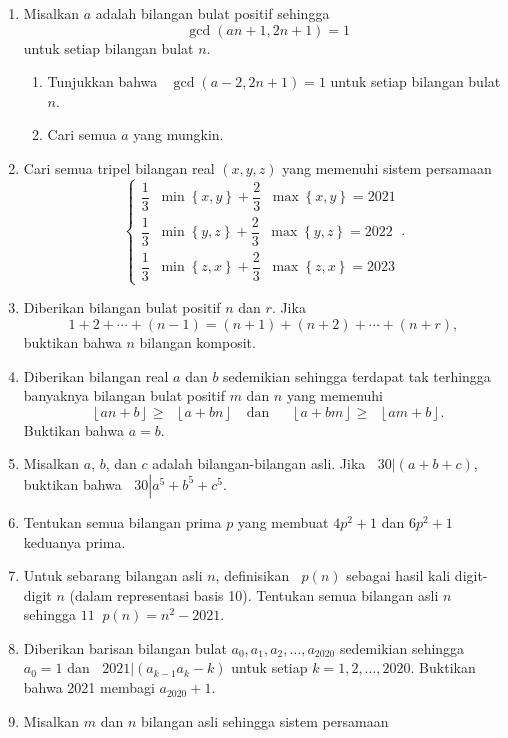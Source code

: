 \documentclass[12pt]{article}
\newcommand*\floor[1]{\mathop{}\!\left\lfloor{#1}\right\rfloor}
\newcommand*\func[2]{\mathop{}\!{#1}{\left({#2}\right)}}
\newcommand*\funl[2]{\mathop{}\!{#1}{\left\lbrace{#2}\right\rbrace}}
\newcommand*\divid[2]{\mathop{}\!{#1} \left| {#2} \right.}
\begin{document}
\begin{enumerate}[leftmargin=*]
		\item Misalkan $ a $ adalah bilangan bulat positif sehingga
		\[ \func{\gcd}{an + 1, 2n + 1} = 1 \]
		untuk setiap bilangan bulat $ n $.
		\begin{enumerate}
			\item Tunjukkan bahwa $ \func{\gcd}{a - 2, 2n + 1} = 1 $ untuk setiap bilangan bulat $ n $.
			\item Cari semua $ a $ yang mungkin.
		\end{enumerate}
		\item Cari semua tripel bilangan real $ \left(x, y, z\right) $ yang memenuhi sistem persamaan
		\[
			\begin{cases}
				\dfrac{1}{3}\funl{\min}{x, y} + \dfrac{2}{3}\funl{\max}{x, y} = 2021 \\[6pt]
				\dfrac{1}{3}\funl{\min}{y, z} + \dfrac{2}{3}\funl{\max}{y, z} = 2022 \\[6pt]
				\dfrac{1}{3}\funl{\min}{z, x} + \dfrac{2}{3}\funl{\max}{z, x} = 2023
			\end{cases}.
		\]
		\item Diberikan bilangan bulat positif $ n $ dan $ r $. Jika
		\[ 1 + 2 + \cdots + \left(n - 1\right) = \left(n + 1\right) + \left(n + 2\right) + \cdots + \left(n + r\right), \]
		buktikan bahwa $ n $ bilangan komposit.
		\item Diberikan bilangan real $ a $ dan $ b $ sedemikian sehingga terdapat tak terhingga banyaknya bilangan bulat positif $ m $ dan $ n $ yang memenuhi
		\[ \floor{an + b} \geq \floor{a + bn} \quad \mbox{dan} \quad \floor{a + bm} \geq \floor{am + b}. \]
		Buktikan bahwa $ a = b $.
		\item Misalkan $ a $, $ b $, dan $ c $ adalah bilangan-bilangan asli. Jika $ \divid{30}{\left(a + b + c\right)} $, buktikan bahwa $ \divid{30}{a^{5} + b^{5} + c^{5}} $.
		\item Tentukan semua bilangan prima $ p $ yang membuat $ 4p^{2} + 1 $ dan $ 6p^{2} + 1 $ keduanya prima.
		\item Untuk sebarang bilangan asli $ n $, definisikan $ \func{p}{n} $ sebagai hasil kali digit-digit $ n $ (dalam representasi basis 10). Tentukan semua bilangan asli $ n $ sehingga $ 11\func{p}{n} = n^{2} - 2021 $.
		\item Diberikan barisan bilangan bulat $ a_{0}, a_{1}, a_{2}, \dots, a_{2020} $ sedemikian sehingga $ a_{0} = 1 $ dan $ \divid{2021}{\left(a_{k - 1}a_{k} - k\right)} $ untuk setiap $ k = 1, 2, \dots, 2020 $. Buktikan bahwa 2021 membagi $ a_{2020} + 1 $.
		\item Misalkan $ m $ dan $ n $ bilangan asli sehingga sistem persamaan

\end{enumerate}
\end{document}
